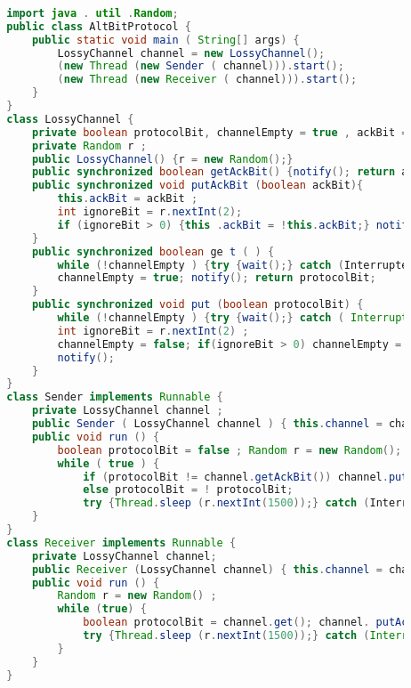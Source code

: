\documentclass{article}
\begin{document}
	\begin{lstlisting}[language=Java]
		
		import java . util .Random;
		public class AltBitProtocol {
			public static void main ( String[] args) {
				LossyChannel channel = new LossyChannel();
				(new Thread (new Sender ( channel))).start();
				(new Thread (new Receiver ( channel))).start();
			}
		}
		class LossyChannel {
			private boolean protocolBit, channelEmpty = true , ackBit = true;
			private Random r ;
			public LossyChannel() {r = new Random();}
			public synchronized boolean getAckBit() {notify(); return ackBit;}
			public synchronized void putAckBit (boolean ackBit){
				this.ackBit = ackBit ;
				int ignoreBit = r.nextInt(2);
				if (ignoreBit > 0) {this .ackBit = !this.ackBit;} notify();
			}
			public synchronized boolean ge t ( ) {
				while (!channelEmpty ) {try {wait();} catch (InterruptedExceptione){}}
				channelEmpty = true; notify(); return protocolBit;
			}
			public synchronized void put (boolean protocolBit) {
				while (!channelEmpty ) {try {wait();} catch ( InterruptedException e){}}
				int ignoreBit = r.nextInt(2) ;
				channelEmpty = false; if(ignoreBit > 0) channelEmpty = true ;
				notify();
			}
		}
		class Sender implements Runnable {
			private LossyChannel channel ;
			public Sender ( LossyChannel channel ) { this.channel = channel; }
			public void run () {
				boolean protocolBit = false ; Random r = new Random();
				while ( true ) {
					if (protocolBit != channel.getAckBit()) channel.put (protocolBit);
					else protocolBit = ! protocolBit;
					try {Thread.sleep (r.nextInt(1500));} catch (InterruptedExption e){}}
			}
		}
		class Receiver implements Runnable {
			private LossyChannel channel;
			public Receiver (LossyChannel channel) { this.channel = channel;}
			public void run () {
				Random r = new Random() ;
				while (true) {
					boolean protocolBit = channel.get(); channel. putAckBit (protocolBit) ;
					try {Thread.sleep (r.nextInt(1500));} catch (InterruptedException e){}
				}
			}
		}
	\end{lstlisting}
\end{document}
